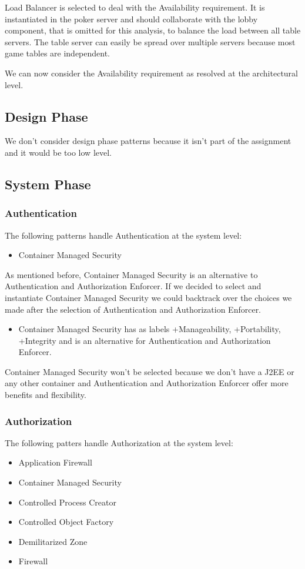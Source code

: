 \documentclass[a4paper,11pt]{report}
\begin{document}
Load Balancer is selected to deal with the Availability requirement. It is instantiated in the poker server and should collaborate with the lobby component, that is omitted for this analysis, to balance the load between all table servers. The table server can easily be spread over multiple servers because most game tables are independent.

We can now consider the Availability requirement as resolved at the architectural level.

\subsection{Design Phase}
We don't consider design phase patterns because it isn't part of the assignment and it would be too
low level.

\subsection{System Phase}

\subsubsection{Authentication}
The following patterns handle Authentication at the system level:
\begin{itemize}
\item Container Managed Security
\end{itemize}

As mentioned before, Container Managed Security is an alternative to Authentication and Authorization Enforcer.
If we decided to select and instantiate Container Managed Security we could backtrack over the choices we made
after the selection of Authentication and Authorization Enforcer.

\begin{itemize}
\item Container Managed Security has as labels +Manageability, +Portability, +Integrity and is an alternative for
Authentication and Authorization Enforcer.
\end{itemize}

Container Managed Security won't be selected because we don't have a J2EE or any other container and Authentication
and Authorization Enforcer offer more benefits and flexibility.

\subsubsection{Authorization}
The following patters handle Authorization at the system level:
\begin{itemize}
\item Application Firewall
\item Container Managed Security
\item Controlled Process Creator
\item Controlled Object Factory
\item Demilitarized Zone
\item Firewall
\end{itemize}
\end{document}
